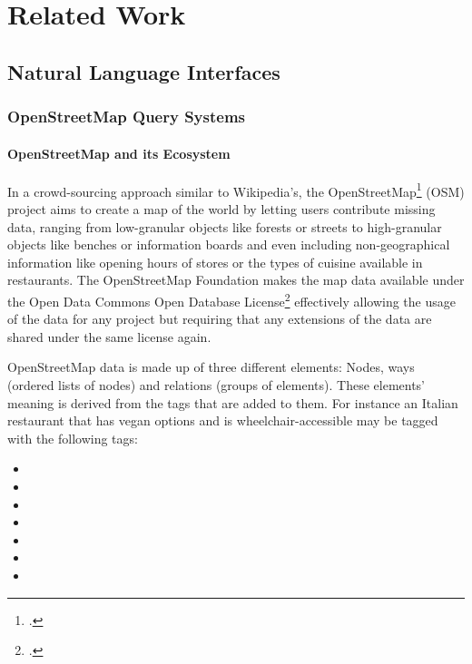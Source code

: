 \chapter{Related Work}
\label{ch:related-work}

\section{Natural Language Interfaces}




\subsection{OpenStreetMap Query Systems}

\subsubsection{OpenStreetMap and its Ecosystem}
\label{sec:osm}

In a crowd-sourcing approach similar to Wikipedia’s, the
OpenStreetMap\footcite{openstreetmap} (OSM) project aims to create a map of the
world by letting users contribute missing data, ranging from low-granular
objects like forests or streets to high-granular objects like benches or
information boards and even including non-geographical information like opening
hours of stores or the types of cuisine available in restaurants. The
OpenStreetMap Foundation makes the map data available under the Open Data
Commons Open Database License\footcite{odbl} effectively allowing the usage of
the data for any project but requiring that any extensions of the data are
shared under the same license again.

OpenStreetMap data is made up of three different elements: Nodes, ways (ordered
lists of nodes) and relations (groups of elements). These elements’ meaning is
derived from the tags that are added to them. For instance an Italian restaurant
that has vegan options and is wheelchair-accessible may be tagged with the
following tags:

\begin{itemize}
\item {}
\item {}
\item {}
\item {}
\item {}
\item {}
\item {}
\end{itemize}

